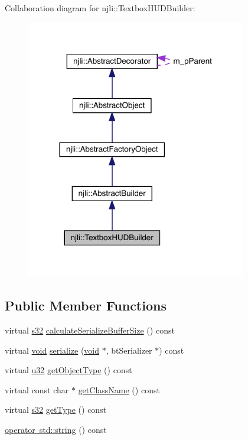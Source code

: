 Collaboration diagram for njli\+:\+:Textbox\+H\+U\+D\+Builder\+:\nopagebreak
\begin{figure}[H]
\begin{center}
\leavevmode
\includegraphics[width=273pt]{classnjli_1_1_textbox_h_u_d_builder__coll__graph}
\end{center}
\end{figure}
\subsection*{Public Member Functions}
\begin{DoxyCompactItemize}
\item 
virtual \mbox{\hyperlink{_util_8h_aa62c75d314a0d1f37f79c4b73b2292e2}{s32}} \mbox{\hyperlink{classnjli_1_1_textbox_h_u_d_builder_addfefe2e0a180026b142ddc56c122287}{calculate\+Serialize\+Buffer\+Size}} () const
\item 
virtual \mbox{\hyperlink{_thread_8h_af1e856da2e658414cb2456cb6f7ebc66}{void}} \mbox{\hyperlink{classnjli_1_1_textbox_h_u_d_builder_a948c1bf9ffa6f87cb52e737f85933a74}{serialize}} (\mbox{\hyperlink{_thread_8h_af1e856da2e658414cb2456cb6f7ebc66}{void}} $\ast$, bt\+Serializer $\ast$) const
\item 
virtual \mbox{\hyperlink{_util_8h_a10e94b422ef0c20dcdec20d31a1f5049}{u32}} \mbox{\hyperlink{classnjli_1_1_textbox_h_u_d_builder_a00dc3fc1a82bfd340d01e5602dd9316d}{get\+Object\+Type}} () const
\item 
virtual const char $\ast$ \mbox{\hyperlink{classnjli_1_1_textbox_h_u_d_builder_adb69c0f10b0407353d8cf9e8fe4d1d1b}{get\+Class\+Name}} () const
\item 
virtual \mbox{\hyperlink{_util_8h_aa62c75d314a0d1f37f79c4b73b2292e2}{s32}} \mbox{\hyperlink{classnjli_1_1_textbox_h_u_d_builder_a1315e4e00afa00b120cc44ac304c51e4}{get\+Type}} () const
\item 
\mbox{\hyperlink{classnjli_1_1_textbox_h_u_d_builder_adfc50a6a259d8d57c0e0d7be1264b5b8}{operator std\+::string}} () const
\end{DoxyCompactItemize}
